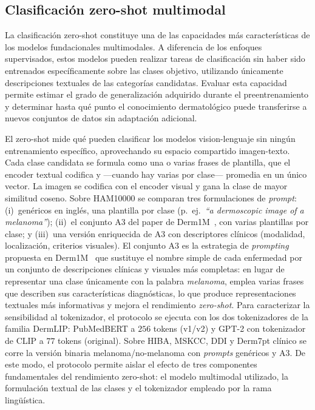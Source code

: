 \subsection{Clasificación zero-shot multimodal}
\label{sec:zs}

La clasificación zero-shot constituye una de las capacidades más
características de los modelos fundacionales multimodales. A
diferencia de los enfoques supervisados, estos modelos pueden
realizar tareas de clasificación sin haber sido entrenados
específicamente sobre las clases objetivo, utilizando únicamente
descripciones textuales de las categorías candidatas. Evaluar esta
capacidad permite estimar el grado de generalización adquirido
durante el preentrenamiento y determinar hasta qué punto el
conocimiento dermatológico puede transferirse a nuevos conjuntos de
datos sin adaptación adicional.

El zero-shot mide qué pueden clasificar los modelos vision-lenguaje
sin ningún entrenamiento específico, aprovechando su espacio
compartido imagen-texto. Cada clase candidata se formula como una o
varias frases de plantilla, que el encoder textual codifica y
—cuando hay varias por clase— promedia en un único vector. La
imagen se codifica con el encoder visual y gana la clase de mayor
similitud coseno. Sobre HAM10000 se comparan tres formulaciones de
\emph{prompt}: (i)~genéricos en inglés, una plantilla por clase
(p.~ej.~\emph{``a dermoscopic image of a melanoma''});
(ii)~el conjunto A3 del paper de Derm1M~\cite{derm1m}, con varias
plantillas por clase; y (iii)~una versión enriquecida de A3 con
descriptores clínicos (modalidad, localización, criterios visuales).
El conjunto A3 es la estrategia de \emph{prompting} propuesta en
Derm1M~\cite{derm1m} que sustituye el nombre simple de cada
enfermedad por un conjunto de descripciones clínicas y visuales más
completas: en lugar de representar una clase únicamente con la
palabra \emph{melanoma}, emplea varias frases que describen sus
características diagnósticas, lo que produce representaciones
textuales más informativas y mejora el rendimiento \emph{zero-shot}.
Para caracterizar la sensibilidad al tokenizador, el protocolo se
ejecuta con los dos tokenizadores de la familia DermLIP: PubMedBERT
a $256$ tokens (v1/v2) y GPT-2 con tokenizador de CLIP a $77$
tokens (original). Sobre HIBA, MSKCC, DDI y Derm7pt clínico se corre
la versión binaria melanoma/no-melanoma con \emph{prompts}
genéricos y A3. De este modo, el protocolo permite aislar el efecto
de tres componentes fundamentales del rendimiento zero-shot: el
modelo multimodal utilizado, la formulación textual de las clases y
el tokenizador empleado por la rama lingüística.

